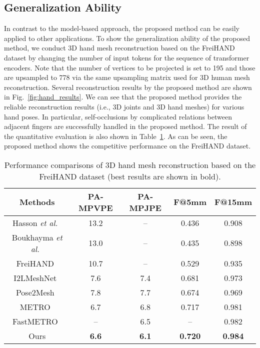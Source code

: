 \documentclass[10pt,twocolumn,letterpaper]{article}
\begin{document}
\subsection{Generalization Ability}
In contrast to the model-based approach, the proposed method can be easily applied to other applications. To show the generalization ability of the proposed method, we conduct 3D hand mesh reconstruction based on the FreiHAND~\cite{Zimmermann19} dataset by changing the number of input tokens for the sequence of transformer encoders. Note that the number of vertices to be projected is set to 195 and those are upsampled to 778 via the same upsampling matrix used for 3D human mesh reconstruction. Several reconstruction results by the proposed method are shown in Fig.~\ref{fig:hand_results}. We can see that the proposed method provides the reliable reconstruction results (i.e., 3D joints and 3D hand meshes) for various hand poses. In particular, self-occlusions by complicated relations between adjacent fingers are successfully handled in the proposed method. The result of the quantitative evaluation is also shown in Table~\ref{table:hand_ablation}. As can be seen, the proposed method shows the competitive performance on the FreiHAND dataset.

\begin{table}[t]
\footnotesize
\begin{center}
\begin{tabular}{c|@{\;\,}c@{\;\,}|@{\;}c@{\;}|@{\;\,}c@{\;\,}|@{\;}c@{\;}}
\hline
Methods & {PA-MPVPE} & {PA-MPJPE} & F@5mm & F@15mm \\
\hline
\hline
Hasson \textit{et al.}~\cite{Hasson19} & 13.2 & -- & 0.436 & 0.908 \\
Boukhayma \textit{et al.}~\cite{Boukhayma19} & 13.0 & -- & 0.435 &  0.898 \\
FreiHAND~\cite{Zimmermann19} & 10.7 & -- & 0.529 & 0.935\\
I2LMeshNet~\cite{Moon2020} & 7.6 & 7.4 & 0.681 & 0.973 \\
Pose2Mesh~\cite{Choi20} & 7.8 & 7.7 & 0.674 &  0.969 \\
METRO~\cite{Lin21} & 6.7 & 6.8 & 0.717 & 0.981 \\
FastMETRO~\cite{Cho22} & -- & 6.5 & -- & 0.982 \\
\hline
Ours & \textbf{6.6} & \textbf{6.1} &\textbf{ 0.720} &\textbf{ 0.984} \\
\hline
\end{tabular}
\caption{\label{table:hand_ablation}Performance comparisons of 3D hand mesh reconstruction based on the FreiHAND dataset (best results are shown in bold).}
\end{center}
\vspace{-5mm}
\end{table}
\end{document}

